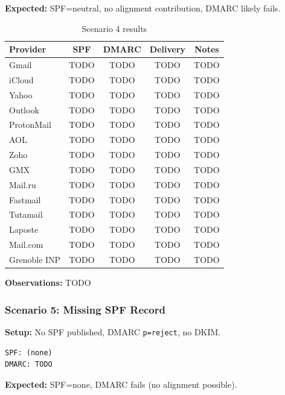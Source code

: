 \documentclass[11pt,a4paper]{article}
\begin{document}
\textbf{Expected:} SPF=neutral, no alignment contribution, DMARC likely fails.

\begin{table}[h]
\centering
\small
\begin{tabular}{lcccc}
\toprule
\textbf{Provider} & \textbf{SPF} & \textbf{DMARC} & \textbf{Delivery} & \textbf{Notes} \\
\midrule
Gmail & TODO & TODO & TODO & TODO \\
iCloud & TODO & TODO & TODO & TODO \\
Yahoo & TODO & TODO & TODO & TODO \\
Outlook & TODO & TODO & TODO & TODO \\
ProtonMail & TODO & TODO & TODO & TODO \\
AOL & TODO & TODO & TODO & TODO \\
Zoho & TODO & TODO & TODO & TODO \\
GMX & TODO & TODO & TODO & TODO \\
Mail.ru & TODO & TODO & TODO & TODO \\
Fastmail & TODO & TODO & TODO & TODO \\
Tutamail & TODO & TODO & TODO & TODO \\
Laposte & TODO & TODO & TODO & TODO \\
Mail.com & TODO & TODO & TODO & TODO \\
Grenoble INP & TODO & TODO & TODO & TODO \\
\bottomrule
\end{tabular}
\caption{Scenario 4 results}
\end{table}

\textbf{Observations:} TODO


\subsubsection{Scenario 5: Missing SPF Record}

\textbf{Setup:} No SPF published, DMARC \texttt{p=reject}, no DKIM.

\begin{lstlisting}
SPF: (none)
DMARC: TODO
\end{lstlisting}

\textbf{Expected:} SPF=none, DMARC fails (no alignment possible).
\end{document}
